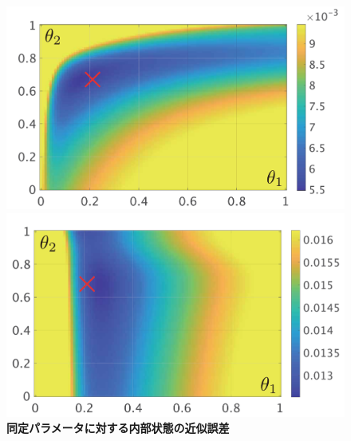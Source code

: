 \documentclass[tombow,dvipdfmx]{corona-a5-1.1}
\begin{document}
\begin{figure}[t!]
  \centering
  {
  \begin{minipage}{0.49\linewidth}
    \centering
    \includegraphics[width = 1\linewidth]{figs/heatdelta}
    \medskip
  \end{minipage}
  \begin{minipage}{0.49\linewidth}
    \centering
    \includegraphics[width = 1\linewidth]{figs/heatE}
    \medskip
  \end{minipage}
}
 \caption{\textbf{同定パラメータに対する内部状態の近似誤差}}
 \label{fig:datamodeling}
\medskip
\end{figure}
\end{document}
